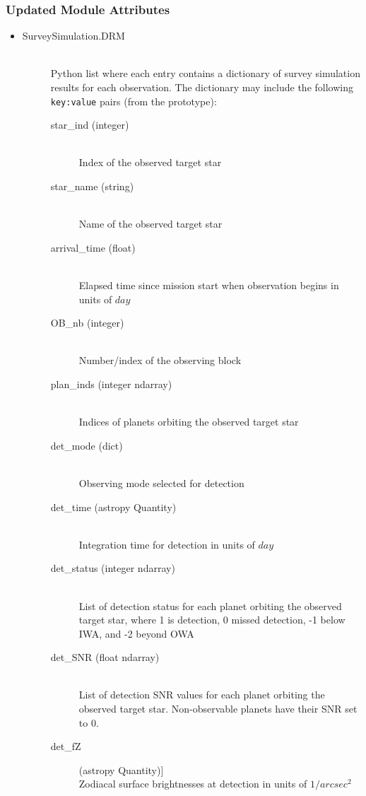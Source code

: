 \documentclass[cleanfoot]{asme2ej}
\begin{document}
\subsubsection*{Updated Module Attributes}
\begin{itemize}
\item 
\begin{description}
    \item[SurveySimulation.DRM] \hfill \\ Python list where each entry contains a dictionary of survey simulation results for each observation.  The dictionary may include the following \verb+key:value+ pairs (from the prototype):
    \begin{description}
        \item[star\_ind (integer)] \hfill \\ Index of the observed target star
        \item[star\_name (string)] \hfill \\ Name of the observed target star
        \item[arrival\_time (float)] \hfill \\ Elapsed time since mission start when observation begins in units of $day$
        \item[OB\_nb (integer)] \hfill \\ Number/index of the observing block
        \item[plan\_inds (integer ndarray)] \hfill \\ Indices of planets orbiting the observed target star
        \item[det\_mode (dict)] \hfill \\ Observing mode selected for detection
        \item[det\_time (astropy Quantity)] \hfill \\ Integration time for detection in units of $ day $
        \item[det\_status (integer ndarray)] \hfill \\ List of detection status for each planet orbiting the observed target star, where 1 is detection, 0 missed detection, -1 below IWA, and -2 beyond OWA
        \item[det\_SNR (float ndarray)] \hfill \\ List of detection SNR values for each planet orbiting the observed target star. Non-observable planets have their SNR set to 0.
        \item[det\_fZ] (astropy Quantity)] \hfill \\ Zodiacal surface brightnesses at detection in units of $1/arcsec^2$

\end{description}
\end{description}
\end{itemize}
\end{document}

